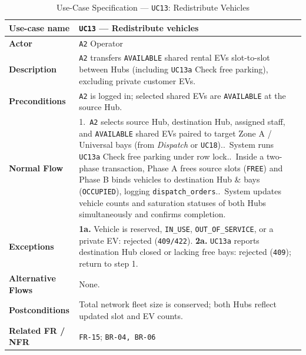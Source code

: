 \begin{table}[H]
  \centering
  \singlespacing\footnotesize
  \caption{Use-Case Specification --- \texttt{UC13}: Redistribute Vehicles}
  \label{tab:uc13}
  \renewcommand{\arraystretch}{1.13}
  \begin{tabularx}{\textwidth}{|L{2.9cm}|Y|}
    \hline
    \textbf{Use-case name} & \textbf{\texttt{UC13} --- Redistribute vehicles} \\
    \hline
    \textbf{Actor} & \texttt{A2} Operator \\
    \hline
    \textbf{Description} & \texttt{A2} transfers \texttt{AVAILABLE} shared rental EVs slot-to-slot between Hubs (including \texttt{UC13a} Check free parking), excluding private customer EVs. \\
    \hline
    \textbf{Preconditions} & \texttt{A2} is logged in; selected shared EVs are \texttt{AVAILABLE} at the source Hub. \\
    \hline
    \textbf{Normal Flow} & 1.\ \texttt{A2} selects source Hub, destination Hub, assigned staff, and \texttt{AVAILABLE} shared EVs paired to target Zone A / Universal bays (from \textit{Dispatch} or \texttt{UC18})..\ System runs \texttt{UC13a} Check free parking under row lock..\ Inside a two-phase transaction, Phase A frees source slots (\texttt{FREE}) and Phase B binds vehicles to destination Hub \& bays (\texttt{OCCUPIED}), logging \texttt{dispatch\_\allowbreak orders}..\ System updates vehicle counts and saturation statuses of both Hubs simultaneously and confirms completion. \\
    \hline
    \textbf{Exceptions} & \textbf{1a.} Vehicle is reserved, \texttt{IN\_\allowbreak USE}, \texttt{OUT\_\allowbreak OF\_\allowbreak SERVICE}, or a private EV: rejected (\texttt{409/422}).\newline
    \textbf{2a.} \texttt{UC13a} reports destination Hub closed or lacking free bays: rejected (\texttt{409}); return to step 1. \\
    \hline
    \textbf{Alternative Flows} & None. \\
    \hline
    \textbf{Postconditions} & Total network fleet size is conserved; both Hubs reflect updated slot and EV counts. \\
    \hline
    \textbf{Related FR / NFR} & \texttt{FR-15}; \texttt{BR-04, BR-06} \\
    \hline
  \end{tabularx}
\end{table}

